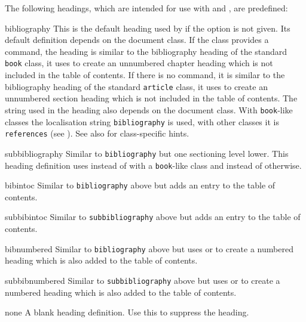 \documentclass{ltxdockit}[2011/03/25]
\begin{document}
The following headings, which are intended for use with  and , are predefined:

\begin{valuelist*}

\item[bibliography]
This is the default heading used by  if the  option is not given. Its default definition depends on the document class. If the class provides a  command, the heading is similar to the bibliography heading of the standard \latex \texttt{book} class, \ie it uses  to create an unnumbered chapter heading which is not included in the table of contents. If there is no  command, it is similar to the bibliography heading of the standard \latex \texttt{article} class, \ie it uses  to create an unnumbered section heading which is not included in the table of contents. The string used in the heading also depends on the document class. With \texttt{book}-like classes the localisation string \texttt{bibliography} is used, with other classes it is \texttt{references} (see ). See also  for class-specific hints.

\item[subbibliography]
Similar to \texttt{bibliography} but one sectioning level lower. This heading definition uses  instead of  with a \texttt{book}-like class and  instead of  otherwise.

\item[bibintoc]
Similar to \texttt{bibliography} above but adds an entry to the table of contents.

\item[subbibintoc]
Similar to \texttt{subbibliography} above but adds an entry to the table of contents.

\item[bibnumbered]
Similar to \texttt{bibliography} above but uses  or  to create a numbered heading which is also added to the table of contents.

\item[subbibnumbered]
Similar to \texttt{subbibliography} above but uses  or  to create a numbered heading which is also added to the table of contents.

\item[none]
A blank heading definition. Use this to suppress the heading.

\end{valuelist*}
\end{document}
